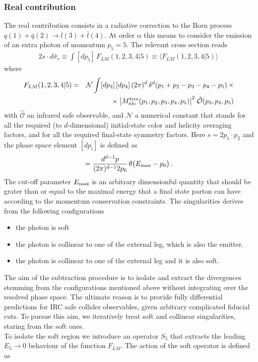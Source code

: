 \documentclass[12pt,a4paper]{article}
\newcommand{\nn}{\nonumber}
\newcommand{\beq}{\begin{eqnarray}}
\newcommand{\eeq}{\end{eqnarray}}
\begin{document}
\subsubsection{Real contribution}
\label{subsec:real_NLO_QED}
The real contribution consists in a radiative correction to the Born process $q(1) +\bar{q}(2) \rightarrow l(3)+\bar{l}(4)$. At order $\alpha$ 
this means to consider the emission of an extra photon of momentum $p_5=5$. The relevant cross section reads
\beq
2s\cdot d\hat{\sigma}_r \equiv \int[dp_5] \, F_{LM}(1,2,3,4 | 5) \equiv \langle F_{LM}(1,2,3,4|5)\rangle \, 
\label{eq:NLO_sigma_R}
\eeq
where
\beq
F_{LM}(1,2,3,4|5)&=&
\mathcal{N} \int [dp_3] \, [dp_4] \,(2\pi)^{d} \, 
\delta^d(p_1+p_2-p_3-p_4-p_5) \, \times
\nn \\
&& \times \; 
\big| M_{\rm nlo}^{\rm tree}(p_1,p_2,p_3,p_4,p_5) \big|^2 \;
\hat{\mathcal{O}}(p_3, p_4,p_5)
\eeq
with $\hat{\mathcal{O}}$ an infrared safe observable, and $\mathcal{N}$ a numerical constant
that stands for all the required (to $d$-dimensional) initial-state color and helicity averaging factors, 
and for all the required final-state symmetry factors. Here $s=2p_1\cdot p_2$ and the phase space element $[dp_i]$ is defined as
\beq
[dp_i] = \frac{d^{d-1}p}{(2\pi)^{d-1} 2p_0} \, \theta \big( E_{\rm max}-p_0 \big) \, .
\eeq
The cut-off parameter $E_{\rm max}$ is an arbitrary dimensionful quantity that should be grater than or equal to the maximal energy that a final state parton can have according to the momentum conservation constraints.   
The singularities derives from the following configurations
\begin{itemize}
\item the photon is soft
\item the photon is collinear to one of the external leg, which is also the emitter.
\item the photon is collinear to one of the external leg and it is also soft.
\end{itemize}
The aim of the subtraction procedure is to isolate and extract the divergences stemming from the 
configurations mentioned above without integrating over the resolved phase space. The ultimate reason is to provide fully differential predictions for IRC safe collider observables, given arbitrary complicated fiducial cuts. To pursue this aim, we iteratively treat soft and collinear singularities, staring from the soft ones. \\
To isolate the soft region we introduce an operator $S_5$ that extracts the leading $E_5\rightarrow0$ behaviour of the function $F_{LM}$. The action of the soft operator is defined as
\end{document}
